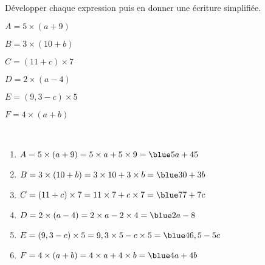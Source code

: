 \begin{colonne*exercice}
\bigskip


\begin{exercice} %
   Développer chaque expression puis en donner une écriture simplifiée.
   \begin{colenumerate}{2}
      \item $A =5\times(a+9)$
      \item $B =3\times(10+b)$
      \item $C =(11+c)\times7$
      \item $D =2\times(a-4)$
      \item $E =(9,3-c)\times5$
      \item $F =4\times(a+b)$
   \end{colenumerate}
\end{exercice}

\begin{corrige}
   \ \\ [-5mm]
   \begin{enumerate}
      \item $A =5\times(a+9) =5\times a+5\times9 =\blue 5a+45$
      \item $B =3\times(10+b) =3\times10+3\times b =\blue 30+3b$
      \item $C =(11+c)\times7 =11\times7+c\times7 =\blue 77+7c$
      \item $D =2\times(a-4) =2\times a-2\times4 =\blue 2a-8$
      \item $E =(9,3-c)\times5 =9,3\times5-c\times5 =\blue 46,5-5c$
      \item $F =4\times(a+b) =4\times a+4\times b =\blue 4a+4b$
   \end{enumerate}
\end{corrige}

\bigskip



\end{colonne*exercice}
